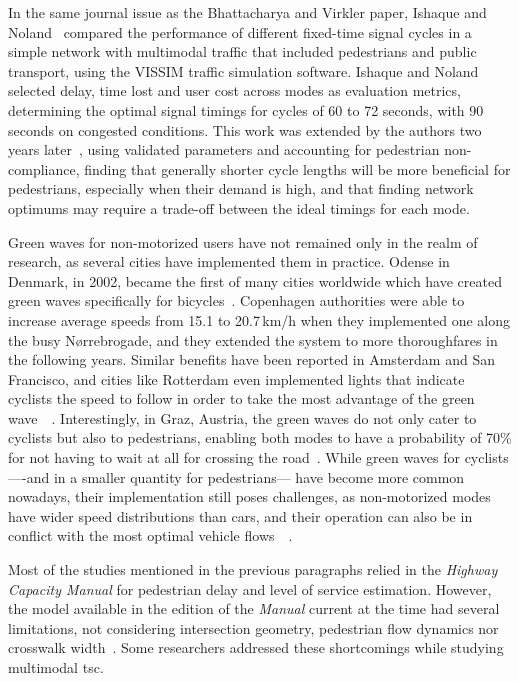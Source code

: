 In the same journal issue as the Bhattacharya and Virkler paper, Ishaque and Noland~\cite{Ishaque2005} compared the performance of different fixed-time signal cycles in a simple network with multimodal traffic that included pedestrians and public transport, using the VISSIM traffic simulation software. Ishaque and Noland selected delay, time lost and user cost across modes as evaluation metrics, determining the optimal signal timings for cycles of 60 to 72 seconds, with 90 seconds on congested conditions. This work was extended by the authors two years later~\cite{Ishaque2007}, using validated parameters and accounting for pedestrian non-compliance, finding that generally shorter cycle lengths will be more beneficial for pedestrians, especially when their demand is high, and that finding network optimums may require a trade-off between the ideal timings for each mode.

\medskip

\noindent Green waves for non-motorized users have not remained only in the realm of research, as several cities have implemented them in practice. Odense in Denmark, in 2002, became the first of many cities worldwide which have created green waves specifically for bicycles~\cite{Apostola2014}. Copenhagen authorities were able to increase average speeds from 15.1 to 20.7\,km/h when they implemented one along the busy Nørrebrogade, and they extended the system to more thoroughfares in the following years. Similar benefits have been reported in Amsterdam and San Francisco, and cities like Rotterdam even implemented lights that indicate cyclists the speed to follow in order to take the most advantage of the green wave~\cite{Apostola2014}~\cite{Cardwell2014}. Interestingly, in Graz, Austria, the green waves do not only cater to cyclists but also to pedestrians, enabling both modes to have a probability of 70\% for not having to wait at all for crossing the road~\cite{Apostola2014}. While green waves for cyclists —-and in a smaller quantity for pedestrians— have become more common nowadays, their implementation still poses challenges, as non-motorized modes have wider speed distributions than cars, and their operation can also be in conflict with the most optimal vehicle flows~\cite{Apostola2014}~\cite{Warberg2008}.

\medskip

\noindent Most of the studies mentioned in the previous paragraphs relied in the \textit{Highway Capacity Manual} for pedestrian delay and level of service estimation. However, the model available in the edition of the \textit{Manual} current at the time had several limitations, not considering intersection geometry, pedestrian flow dynamics nor crosswalk width~\cite{Li2010}. Some researchers addressed these shortcomings while studying multimodal \gls{tsc}.

